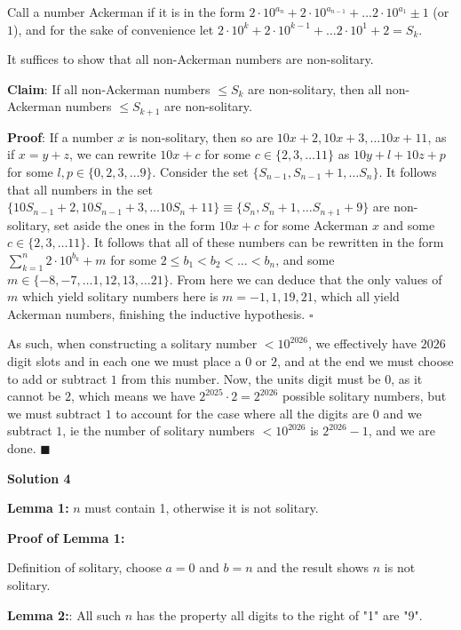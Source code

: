 \begin{enumerate}
 Call a number Ackerman if it is in the form $2 \cdot 10^{a_n}+2 \cdot 10^{a_{n-1}}+ \ldots 2 \cdot 10^{a_1} \pm 1$ (or $1$), and for the sake of convenience let $2 \cdot 10^k+2 \cdot 10^{k-1} + \ldots 2 \cdot 10^1+2=S_k$. 

 It suffices to show that all non-Ackerman numbers are non-solitary.

 \textbf{Claim}: If all non-Ackerman numbers $\le S_k$ are non-solitary, then all non-Ackerman numbers $\le S_{k+1}$ are non-solitary.

 \textbf{Proof}: If a number $x$ is non-solitary, then so are $10x+2, 10x+3, \ldots 10x+11$, as if $x=y+z$, we can rewrite $10x+c$ for some $c \in \{2,3, \ldots 11 \}$ as $10y+l+10z+p$ for some $l,p \in \{0,2,3, \ldots 9 \}$. Consider the set $\{ S_{n-1}, S_{n-1}+1, \ldots S_n \}$. It follows that all numbers in the set $\{ 10S_{n-1}+2, 10S_{n-1}+3, \ldots 10S_n+11 \} \equiv \{S_n, S_n+1, \ldots S_{n+1}+9 \}$ are non-solitary, set aside the ones in the form $10x+c$ for some Ackerman $x$ and some $c \in \{2,3, \ldots 11 \}$. It follows that all of these numbers can be rewritten in the form $\sum_{k=1}^{n} 2 \cdot 10^{b_k}+m$ for some $2 \le b_1 <b_2< \ldots < b_n$, and some $m \in \{-8, -7, \ldots 1, 12, 13, \ldots 21 \}$. From here we can deduce that the only values of $m$ which yield solitary numbers here is $m=-1,1,19,21$, which all yield Ackerman numbers, finishing the inductive hypothesis. $\square$

 As such, when constructing a solitary number $< 10^{2026}$, we effectively have $2026$ digit slots and in each one we must place a $0$ or $2$, and at the end we must choose to add or subtract $1$ from this number. Now, the units digit must be $0$, as it cannot be $2$, which means we have $2^{2025} \cdot 2=2^{2026}$ possible solitary numbers, but we must subtract $1$ to account for the case where all the digits are $0$ and we subtract $1$, ie the number of solitary numbers $< 10^{2026}$ is $\boxed{2^{2026}-1}$, and we are done. $\blacksquare$




\textbf{Solution 4}

\textbf{Lemma 1:} $n$ must contain 1, otherwise it is not solitary.

 \textbf{Proof of Lemma 1:}

 Definition of solitary, choose $a = 0$ and $b = n$ and the result shows $n$ is not solitary.

 \textbf{Lemma 2:}: All such $n$ has the property all digits to the right of "1" are "9".


\end{enumerate}
